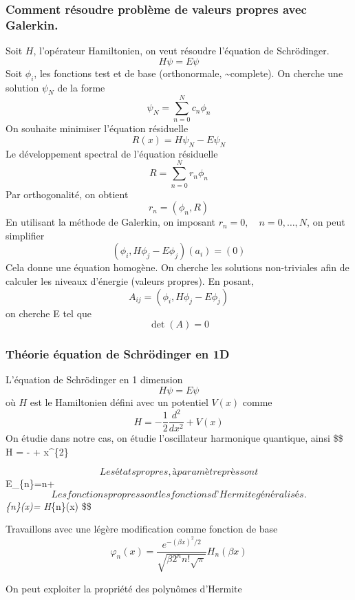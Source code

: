 \documentclass[
]{article}
\author{}
\date{}
\begin{document}
\hypertarget{comment-ruxe9soudre-probluxe8me-de-valeurs-propres-avec-galerkin.}{%
\subsubsection{Comment résoudre problème de valeurs propres avec
Galerkin.}\label{comment-ruxe9soudre-probluxe8me-de-valeurs-propres-avec-galerkin.}}

Soit \(H\), l'opérateur Hamiltonien, on veut résoudre l'équation de
Schrödinger. \[
H\psi = E\psi
\] Soit \(\phi_{i}\), les fonctions test et de base (orthonormale,
\textasciitilde complete). On cherche une solution \(\psi _N\) de la
forme \[
\psi_{N} = \sum_{n=0}^{N}c_{n}\phi_{n}
\] On souhaite minimiser l'équation résiduelle \[
R(x) = H\psi_{N}-E\psi_{N}
\] Le développement spectral de l'équation résiduelle \[
R =\sum_{n=0}^{N}r_{n}\phi_{n}
\] Par orthogonalité, on obtient \[
r_{n} =(\phi_{n},R)
\] En utilisant la méthode de Galerkin, on imposant
\(r_{n}= 0, \quad n= 0,\dots,N\), on peut simplifier \[
(\phi_{i},H\phi_{j}-E\phi_{j})(a_{i}) = (0)
\] Cela donne une équation homogène. On cherche les solutions
non-triviales afin de calculer les niveaux d'énergie (valeurs propres).
En posant, \[
A_{ij} =(\phi_{i},H\phi_{j}-E\phi_{j}) 
\] on cherche E tel que \[
\det(A) = 0
\]

\hypertarget{thuxe9orie-uxe9quation-de-schruxf6dinger-en-1d}{%
\subsubsection{Théorie équation de Schrödinger en
1D}\label{thuxe9orie-uxe9quation-de-schruxf6dinger-en-1d}}

L'équation de Schrödinger en 1 dimension \[
H\psi=E\psi
\] où \(H\) est le Hamiltonien défini avec un potentiel \(V(x)\) comme
\[
H = -\frac{1}{2} \frac{d^{2}}{dx^{2}} +V(x)
\] On étudie dans notre cas, on étudie l'oscillateur harmonique
quantique, ainsi \$\$ H = -  +
x\^{}\{2\}

\[
Les états propres, à paramètre près sont
\] E\_\{n\}=n+ \[
Les fonctions propres sont les fonctions d’Hermite généralisés.
\] \psi\emph{\{n\}(x)=
H}\{n\}(x) \$\$

Travaillons avec une légère modification comme fonction de base \[
\varphi_{n}(x)= \frac{e^{-(\beta x)^{2}/2}}{\sqrt{\beta2^{n}n!\sqrt{ \pi }  }}H_{n}(\beta x)
\]

On peut exploiter la propriété des polynômes d'Hermite
\end{document}
